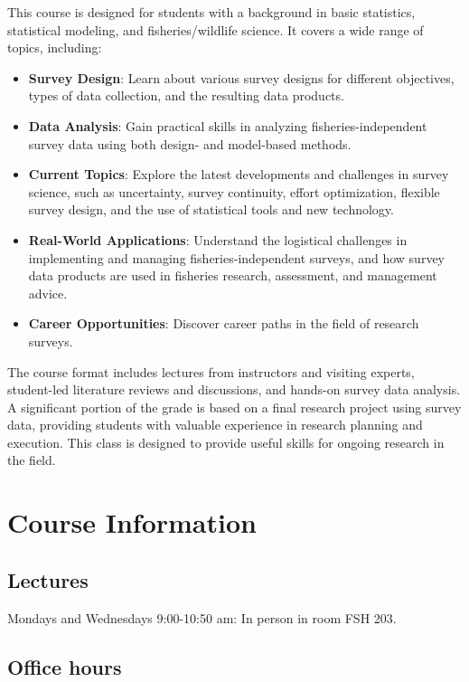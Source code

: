 \documentclass[
  letterpaper,
  oneside,
  open=any]{scrbook}
\providecommand{\tightlist}{%
  \setlength{\itemsep}{0pt}\setlength{\parskip}{0pt}}\usepackage{longtable,booktabs,array}
\begin{document}
This course is designed for students with a background in basic
statistics, statistical modeling, and fisheries/wildlife science. It
covers a wide range of topics, including:

\begin{itemize}
\tightlist
\item
  \textbf{Survey Design}: Learn about various survey designs for
  different objectives, types of data collection, and the resulting data
  products.
\item
  \textbf{Data Analysis}: Gain practical skills in analyzing
  fisheries-independent survey data using both design- and model-based
  methods.
\item
  \textbf{Current Topics}: Explore the latest developments and
  challenges in survey science, such as uncertainty, survey continuity,
  effort optimization, flexible survey design, and the use of
  statistical tools and new technology.
\item
  \textbf{Real-World Applications}: Understand the logistical challenges
  in implementing and managing fisheries-independent surveys, and how
  survey data products are used in fisheries research, assessment, and
  management advice.
\item
  \textbf{Career Opportunities}: Discover career paths in the field of
  research surveys.
\end{itemize}

The course format includes lectures from instructors and visiting
experts, student-led literature reviews and discussions, and hands-on
survey data analysis. A significant portion of the grade is based on a
final research project using survey data, providing students with
valuable experience in research planning and execution. This class is
designed to provide useful skills for ongoing research in the field.


\chapter{Course Information}\label{course-information}

\section{Lectures}\label{lectures}

Mondays and Wednesdays 9:00-10:50 am: In person in room FSH 203.

\section{Office hours}\label{office-hours}
\end{document}
